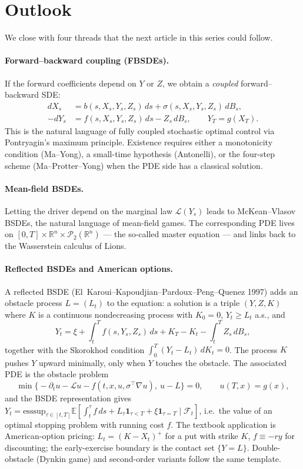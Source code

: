 \documentclass{article}
\newcommand{\E}{\mathbb{E}}
\newcommand{\R}{\mathbb{R}}
\newcommand{\F}{\mathcal{F}}
\newcommand{\Lc}{\mathcal{L}}
\begin{document}
\section{Outlook}

We close with four threads that the next article in this series could follow.

\paragraph{Forward--backward coupling (FBSDEs).} If the forward coefficients depend on $Y$ or $Z$, we obtain a \emph{coupled} forward--backward SDE:
\begin{align*}
  dX_s &= b(s, X_s, Y_s, Z_s)\,ds + \sigma(s, X_s, Y_s, Z_s)\, dB_s, \\
  -dY_s &= f(s, X_s, Y_s, Z_s)\,ds - Z_s\, dB_s, \qquad Y_T = g(X_T).
\end{align*}
This is the natural language of fully coupled stochastic optimal control via Pontryagin's maximum principle. Existence requires either a monotonicity condition (Ma--Yong), a small-time hypothesis (Antonelli), or the four-step scheme (Ma--Protter--Yong) when the PDE side has a classical solution.

\paragraph{Mean-field BSDEs.} Letting the driver depend on the marginal law $\mathcal{L}(Y_s)$ leads to McKean--Vlasov BSDEs, the natural language of mean-field games. The corresponding PDE lives on $[0, T] \times \R^n \times \mathcal{P}_2(\R^n)$ --- the so-called master equation --- and links back to the Wasserstein calculus of Lions.

\paragraph{Reflected BSDEs and American options.} A reflected BSDE (El~Karoui--Kapoudjian--Pardoux--Peng--Quenez 1997) adds an obstacle process $L = (L_t)$ to the equation: a solution is a triple $(Y, Z, K)$ where $K$ is a continuous nondecreasing process with $K_0 = 0$, $Y_t \ge L_t$ a.s., and
\[
  Y_t = \xi + \int_t^T f(s, Y_s, Z_s)\,ds + K_T - K_t - \int_t^T Z_s\, dB_s,
\]
together with the Skorokhod condition $\int_0^T (Y_t - L_t)\,dK_t = 0$. The process $K$ pushes $Y$ upward minimally, only when $Y$ touches the obstacle. The associated PDE is the obstacle problem
\[
  \min\!\big\{ -\partial_t u - \Lc u - f(t, x, u, \sigma^{\top}\nabla u),\ u - L \big\} = 0, \qquad u(T, x) = g(x),
\]
and the BSDE representation gives $Y_t = \mathrm{esssup}_{\tau \in [t, T]} \E[\int_t^\tau f\, ds + L_\tau \mathbf{1}_{\tau < T} + \xi \mathbf{1}_{\tau = T} \mid \F_t]$, i.e.\ the value of an optimal stopping problem with running cost $f$. The textbook application is American-option pricing: $L_t = (K - X_t)^+$ for a put with strike $K$, $f \equiv -r y$ for discounting; the early-exercise boundary is the contact set $\{Y = L\}$. Double-obstacle (Dynkin game) and second-order variants follow the same template.
\end{document}

